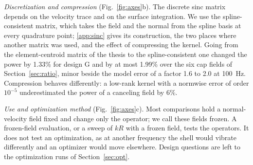 \documentclass[preprint,12pt]{elsarticle}
\begin{document}
\emph{Discretization and compression} (Fig.~\ref{fig:axes}b). The discrete sinc matrix depends on the velocity trace and on the surface integration. We use the spline-consistent matrix, which takes the field and the normal from the spline basis at every quadrature point; \ref{app:sinc} gives its construction, the two places where another matrix was used, and the effect of compressing the kernel. Going from the element-centroid matrix of the thesis \cite{daSilva2024} to the spline-consistent one changed the power by 1.33\% for design G and by at most 1.99\% over the six cap fields of Section~\ref{sec:ratio}, minor beside the model error of a factor 1.6 to 2.0 at 100~Hz. %
Compression behaves differently: a low-rank kernel with a normwise error of order $10^{-5}$ underestimated the power of a canceling field by 6\%. %

\emph{Use and optimization method} (Fig.~\ref{fig:axes}c). Most comparisons hold a normal-velocity field fixed and change only the operator; we call these fields frozen. A frozen-field evaluation, or a sweep of $kR$ with a frozen field, tests the operators. It does not test an optimization, as at another frequency the shell would vibrate differently and an optimizer would move elsewhere. Design questions are left to the optimization runs of Section~\ref{sec:opt}.

\end{document}
